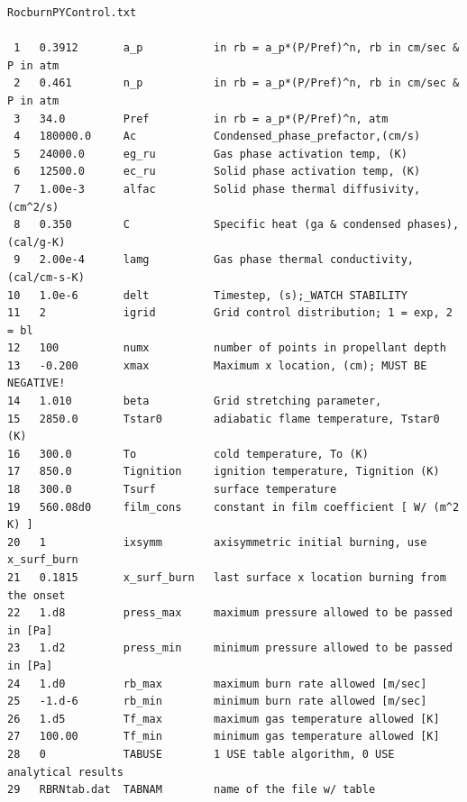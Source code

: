 \begin{small}
\begin{Verbatim}[frame=single]
                              RocburnPYControl.txt

 1   0.3912       a_p           in rb = a_p*(P/Pref)^n, rb in cm/sec & P in atm
 2   0.461        n_p           in rb = a_p*(P/Pref)^n, rb in cm/sec & P in atm
 3   34.0         Pref          in rb = a_p*(P/Pref)^n, atm
 4   180000.0     Ac            Condensed_phase_prefactor,(cm/s)
 5   24000.0      eg_ru         Gas phase activation temp, (K)
 6   12500.0      ec_ru         Solid phase activation temp, (K)
 7   1.00e-3      alfac         Solid phase thermal diffusivity, (cm^2/s)
 8   0.350        C             Specific heat (ga & condensed phases), (cal/g-K)
 9   2.00e-4      lamg          Gas phase thermal conductivity, (cal/cm-s-K)
10   1.0e-6       delt          Timestep, (s);_WATCH STABILITY
11   2            igrid         Grid control distribution; 1 = exp, 2 = bl
12   100          numx          number of points in propellant depth
13   -0.200       xmax          Maximum x location, (cm); MUST BE NEGATIVE!
14   1.010        beta          Grid stretching parameter,
15   2850.0       Tstar0        adiabatic flame temperature, Tstar0 (K)
16   300.0        To            cold temperature, To (K)
17   850.0        Tignition     ignition temperature, Tignition (K)
18   300.0        Tsurf         surface temperature
19   560.08d0     film_cons     constant in film coefficient [ W/ (m^2 K) ]
20   1            ixsymm        axisymmetric initial burning, use x_surf_burn
21   0.1815       x_surf_burn   last surface x location burning from the onset
22   1.d8         press_max     maximum pressure allowed to be passed in [Pa]
23   1.d2         press_min     minimum pressure allowed to be passed in [Pa]
24   1.d0         rb_max        maximum burn rate allowed [m/sec]
25   -1.d-6       rb_min        minimum burn rate allowed [m/sec]
26   1.d5         Tf_max        maximum gas temperature allowed [K]
27   100.00       Tf_min        minimum gas temperature allowed [K]
28   0            TABUSE        1 USE table algorithm, 0 USE analytical results
29   RBRNtab.dat  TABNAM        name of the file w/ table
\end{Verbatim}
\end{small}